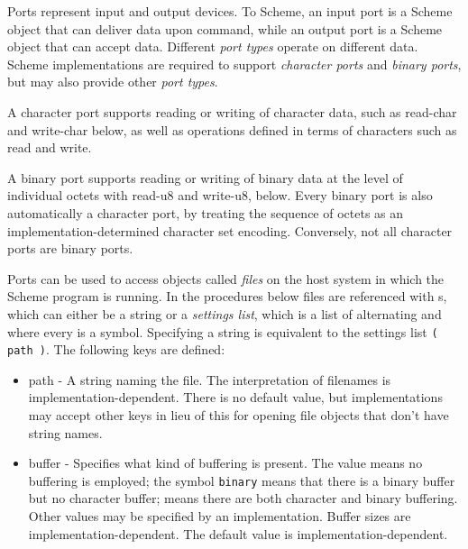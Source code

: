 Ports represent input and output devices.  To Scheme, an input port is
a Scheme object that can deliver data upon command, while an output
port is a Scheme object that can accept data.
Different {\em port types} operate on different data.  Scheme
imple\-men\-ta\-tions are required to support {\em character ports}
and {\em binary ports}, but may also provide other {\em port types}.

A character port supports reading or writing of character data, such
as {\cf read-char} and {\cf write-char} below, as well as operations
defined in terms of characters such as {\cf read} and {\cf write}.

A binary port supports reading or writing of binary data at the level
of individual octets with {\cf read-u8} and {\cf write-u8}, below.
Every binary port is also automatically a character port, by treating
the sequence of octets as an implementation-determined character set
encoding.  Conversely, not all character ports are binary ports.

Ports can be used to access objects called {\em files} on the host
system in which the Scheme program is running.  In the procedures
below files are referenced with s, which can either
be a string or a {\em settings list}, which is a list of alternating
 and  where every  is a symbol.
Specifying a string is equivalent to the settings list \texttt{({\cf
    path} )}. The following keys are defined:

\begin{itemize}

\item {\cf path} - A string naming the file.  The interpretation of
  filenames is implementation-dependent.  There is no default value,
  but implementations may accept other keys in lieu of this for
  opening file objects that don't have string names.

\item {\cf buffer} - Specifies what kind of buffering is present.  The
  value \schfalse{} means no buffering is employed; the symbol
  \texttt{binary} means that there is a binary buffer but no character
  buffer; \schtrue{} means there are both character and binary
  buffering.  Other values may be specified by an implementation.
  Buffer sizes are implementation-dependent.  The default value is
  implementation-dependent.

\end{itemize}

